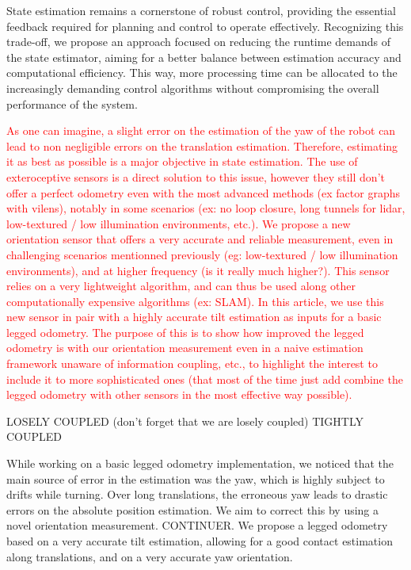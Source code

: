 \documentclass{IJCAS}
\begin{document}
State estimation remains a cornerstone of robust control, providing the essential feedback required for planning and control to operate effectively. Recognizing this trade-off, we propose an approach focused on reducing the runtime demands of the state estimator, aiming for a better balance between estimation accuracy and computational efficiency. This way, more processing time can be allocated to the increasingly demanding control algorithms without compromising the overall performance of the system.


\textcolor{red}{
As one can imagine, a slight error on the estimation of the yaw of the robot can lead to non negligible errors on the translation estimation. Therefore, estimating it as best as possible is a major objective in state estimation. The use of exteroceptive sensors is a direct solution to this issue, however they still don't offer a perfect odometry even with the most advanced methods (ex factor graphs with vilens), notably in some scenarios (ex: no loop closure, long tunnels for lidar, low-textured / low illumination environments, etc.). We propose a new orientation sensor that offers a very accurate and reliable measurement, even in challenging scenarios mentionned previously (eg: low-textured / low illumination environments), and at higher frequency (is it really much higher?). This sensor relies on a very lightweight algorithm, and can thus be used along other computationally expensive algorithms (ex: SLAM). In this article, we use this new sensor in pair with a highly accurate tilt estimation as inputs for a basic legged odometry. The purpose of this is to show how improved the legged odometry is with our orientation measurement even in a naive estimation framework unaware of information coupling, etc., to highlight the interest to include it  to more sophisticated ones (that most of the time just add combine the legged odometry with other sensors in the most effective way possible).}
    
    LOSELY COUPLED (don't forget that we are losely coupled)
    TIGHTLY COUPLED

    While working on a basic legged odometry implementation, we noticed that the main source of error in the estimation was the yaw, which is highly subject to drifts while turning. Over long translations, the erroneous yaw leads to drastic errors on the absolute position estimation. We aim to correct this by using a novel orientation measurement. CONTINUER.
    We propose a legged odometry based on a very accurate tilt estimation, allowing for a good contact estimation along translations, and on a very accurate yaw orientation.
\end{document}
